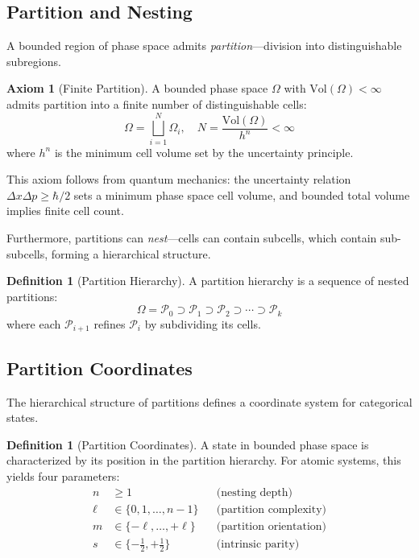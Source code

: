 \documentclass[twocolumn,10pt,a4paper]{article}
\theoremstyle{definition}
\newtheorem{definition}[theorem]{Definition}
\newtheorem{axiom}{Axiom}
\theoremstyle{remark}
\newcommand{\Part}{\mathcal{P}}
\begin{document}
\subsection{Partition and Nesting}

A bounded region of phase space admits \emph{partition}---division into distinguishable subregions.

\begin{axiom}[Finite Partition]
\label{ax:partition}
A bounded phase space $\Omega$ with $\mathrm{Vol}(\Omega) < \infty$ admits partition into a finite number of distinguishable cells:
\begin{equation}
    \Omega = \bigsqcup_{i=1}^{N} \Omega_i, \quad N = \frac{\mathrm{Vol}(\Omega)}{h^n} < \infty
\end{equation}
where $h^n$ is the minimum cell volume set by the uncertainty principle.
\end{axiom}

This axiom follows from quantum mechanics: the uncertainty relation $\Delta x \Delta p \geq \hbar/2$ sets a minimum phase space cell volume, and bounded total volume implies finite cell count.

Furthermore, partitions can \emph{nest}---cells can contain subcells, which contain sub-subcells, forming a hierarchical structure.

\begin{definition}[Partition Hierarchy]
\label{def:hierarchy}
A partition hierarchy is a sequence of nested partitions:
\begin{equation}
    \Omega = \Part_0 \supset \Part_1 \supset \Part_2 \supset \cdots \supset \Part_k
\end{equation}
where each $\Part_{i+1}$ refines $\Part_i$ by subdividing its cells.
\end{definition}

\subsection{Partition Coordinates}

The hierarchical structure of partitions defines a coordinate system for categorical states.

\begin{definition}[Partition Coordinates]
\label{def:coords}
A state in bounded phase space is characterized by its position in the partition hierarchy. For atomic systems, this yields four parameters:
\begin{align}
    n &\geq 1 && \text{(nesting depth)} \\
    \ell &\in \{0, 1, \ldots, n-1\} && \text{(partition complexity)} \\
    m &\in \{-\ell, \ldots, +\ell\} && \text{(partition orientation)} \\
    s &\in \{-\tfrac{1}{2}, +\tfrac{1}{2}\} && \text{(intrinsic parity)}
\end{align}
\end{definition}
\end{document}
